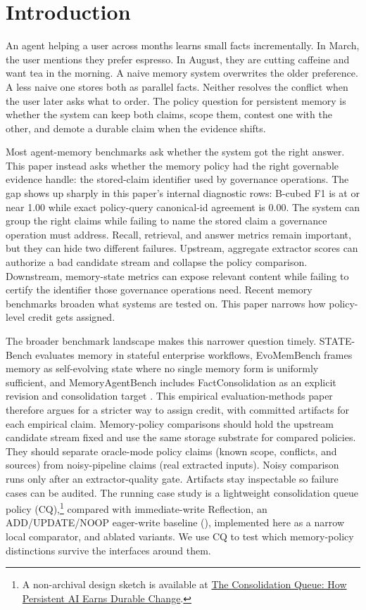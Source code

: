 \section{Introduction}

An agent helping a user across months learns small facts incrementally. In
March, the user mentions they prefer espresso. In August, they are cutting
caffeine and want tea in the morning. A naive memory system overwrites the
older preference. A less naive one stores both as parallel facts. Neither
resolves the conflict when the user later asks what to order. The policy
question for persistent memory is whether the system can keep both claims,
scope them, contest one with the other, and demote a durable claim when the
evidence shifts.

Most agent-memory benchmarks ask whether the system got the right answer. This
paper instead asks whether the memory policy had the right governable evidence
handle: the stored-claim identifier used by governance operations. The gap
shows up sharply in this paper's internal diagnostic
rows: B-cubed F1 is at or near 1.00 while exact policy-query canonical-id
agreement is 0.00. The system can group the right claims while failing to name
the stored claim a governance operation must address. Recall, retrieval, and
answer metrics remain important, but they can hide two different failures.
Upstream, aggregate extractor scores can authorize a bad candidate stream and
collapse the policy comparison. Downstream, memory-state metrics can expose
relevant content while failing to certify the identifier those governance
operations need. Recent memory benchmarks broaden what systems are tested on.
This paper narrows how policy-level credit gets assigned.

The broader benchmark landscape makes this narrower question timely. STATE-Bench
evaluates memory in stateful enterprise workflows, EvoMemBench frames memory as
self-evolving state where no single memory form is uniformly sufficient, and
MemoryAgentBench includes FactConsolidation as an explicit revision and
consolidation target \cite{statebench2026,evomembench2026,memoryagentbench2025}.
This empirical evaluation-methods paper therefore argues for a stricter way to
assign credit, with committed artifacts for each empirical claim.
Memory-policy comparisons should hold the upstream candidate stream fixed and
use the same storage substrate for compared policies.
They should separate oracle-mode policy claims (known scope, conflicts, and
sources) from noisy-pipeline claims (real extracted inputs). Noisy comparison
runs only after an extractor-quality gate. Artifacts stay inspectable so
failure cases can be audited. The running case study is a lightweight
consolidation queue policy
(CQ),\footnote{A non-archival design sketch is available at
\href{https://www.manavm.com/writing/the-consolidation-queue/}{The
Consolidation Queue: How Persistent AI Earns Durable Change}.} compared with
immediate-write Reflection, an ADD/UPDATE/NOOP eager-write baseline
(\memzero{}), implemented here as a narrow local comparator, and ablated
variants. We use CQ to test which memory-policy distinctions survive the
interfaces around them.

